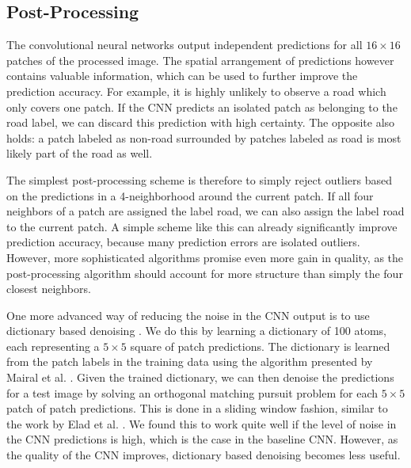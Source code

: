 \documentclass[10pt,conference,compsocconf]{IEEEtran}
\begin{document}
\subsection{Post-Processing}
The convolutional neural networks output independent predictions for all $ 16 \times 16 $ patches of the processed image. The spatial arrangement of predictions however contains valuable information, which can be used to further improve the prediction accuracy. For example, it is highly unlikely to observe a road which only covers one patch. If the CNN predicts an isolated patch as belonging to the road label, we can discard this prediction with high certainty. The opposite also holds: a patch labeled as non-road surrounded by patches labeled as road is most likely part of the road as well.

\par 
The simplest post-processing scheme is therefore to simply reject outliers based on the predictions in a 4-neighborhood around the current patch. If all four neighbors of a patch are assigned the label road, we can also assign the label road to the current patch. A simple scheme like this can already significantly improve prediction accuracy, because many prediction errors are isolated outliers. However, more sophisticated algorithms promise even more gain in quality, as the post-processing algorithm should account for more structure than simply the four closest neighbors.

\par 
One more advanced way of reducing the noise in the CNN output is to use dictionary based denoising \cite{Elad.2006}. We do this by learning a dictionary of 100 atoms, each representing a  $ 5 \times 5 $ square of patch predictions. The dictionary is learned from the patch labels in the training data using the algorithm presented by Mairal et al. \cite{Mairal.2009}. Given the trained dictionary, we can then denoise the predictions for a test image by solving an orthogonal matching pursuit problem for each $ 5 \times 5 $ patch of patch predictions. This is done in a sliding window fashion, similar to the work by Elad et al. \cite{Elad.2006}. We found this to work quite well if the level of noise in the CNN predictions is high, which is the case in the baseline CNN. However, as the quality of the CNN improves, dictionary based denoising becomes less useful.
\end{document}
